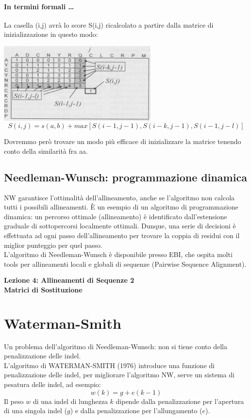 \documentclass{article}
\begin{document}
\paragraph{In termini formali \dots} La casella (i,j) avrà lo score S(i,j)
ricalcolato a partire dalla matrice di inizializzazione in questo
modo:
\begin{center}
    \includegraphics[width=0.6\textwidth]{figures/otto.png}
    $$ S(i,j) = {s(a,b) + max[S(i-1,j-1),S(i-k,j-1),S(i-1,j-l)]}$$
\end{center}
Dovremmo però trovare un modo più efficace di inizializzare la
matrice tenendo conto della similarità fra aa.
\subsection{Needleman-Wunsch: programmazione dinamica}
NW garantisce l'ottimalità dell'allineamento, anche se l'algoritmo non
calcola tutti i possibili allineamenti.
È un esempio di un algoritmo di programmazione dinamica:
un percorso ottimale (allineamento) è identificato dall'estensione
graduale di sottopercorsi localmente ottimali.
Dunque, una serie di decisioni è effettuata ad ogni passo
dell'allineamento per trovare la coppia di residui con il miglior
punteggio per quel passo.\\
L'algoritmo di Needleman-Wunsch è disponibile presso
EBI, che ospita molti tools per allineamenti locali e globali di
sequenze (Pairwise Sequence Alignment).

\begin{titlepage}
    \begin{center}
        \vspace*{1cm}
        \LARGE
        \textbf{Lezione 4: Allineamenti di Sequenze 2\\Matrici di Sostituzione}

    \end{center}
\end{titlepage}
\setcounter{page}{30}
\section{Waterman-Smith}
Un problema dell'algoritmo di Needleman-Wunsch: non si
tiene conto della penalizzazione delle indel.\\
L'algoritmo di WATERMAN-SMITH (1976) introduce
una funzione di penalizzazione delle indel, per migliorare
l'algoritmo NW, serve un sistema di pesatura delle indel, ad esempio:
$$ w(k) = g + e(k-1)$$
Il peso $w$ di una indel di lunghezza $k$ dipende dalla
penalizzazione per l'apertura di una singola indel ($g$) e
dalla penalizzazione per l'allungamento ($e$).
\end{document}
